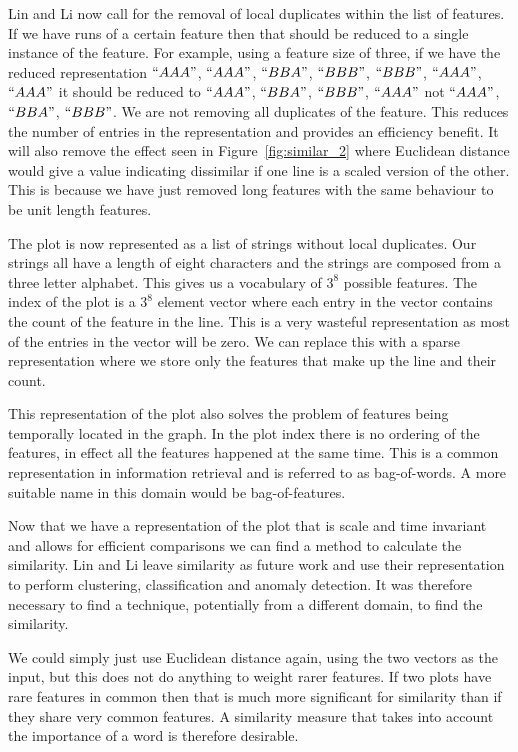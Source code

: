 Lin and Li now call for the removal of local duplicates within the list of features.  If we have runs of a certain feature then that should be reduced to a single instance of the feature.  For example, using a feature size of three, if we have the reduced representation $``AAA"$, $``AAA"$, $``BBA"$, $``BBB"$, $``BBB"$, $``AAA"$, $``AAA"$ it should be reduced to $``AAA"$, $``BBA"$, $``BBB"$, $``AAA"$ not $``AAA"$, $``BBA"$, $``BBB"$.  We are not removing all duplicates of the feature.  This reduces the number of entries in the representation and provides an efficiency benefit.  It will also remove the effect seen in Figure~\ref{fig:similar_2} where Euclidean distance would give a value indicating dissimilar if one line is a scaled version of the other.  This is because we have just removed long features with the same behaviour to be unit length features.

The plot is now represented as a list of strings without local duplicates.  Our strings all have a length of eight characters and the strings are composed from a three letter alphabet.  This gives us a vocabulary of $3^8$ possible features.  The index of the plot is a $3^8$ element vector where each entry in the vector contains the count of the feature in the line.  This is a very wasteful representation as most of the entries in the vector will be zero.  We can replace this with a sparse representation where we store only the features that make up the line and their count.

This representation of the plot also solves the problem of features being temporally located in the graph.  In the plot index there is no ordering of the features, in effect all the features happened at the same time.  This is a common representation in information retrieval and is referred to as bag-of-words.  A more suitable name in this domain would be bag-of-features.

Now that we have a representation of the plot that is scale and time invariant and allows for efficient comparisons we can find a method to calculate the similarity.  Lin and Li leave similarity as future work and use their representation to perform clustering, classification and anomaly detection.  It was therefore necessary to find a technique, potentially from a different domain, to find the similarity.

We could simply just use Euclidean distance again, using the two vectors as the input, but this does not do anything to weight rarer features.  If two plots have rare features in common then that is much more significant for similarity than if they share very common features.  A similarity measure that takes into account the importance of a word is therefore desirable.

